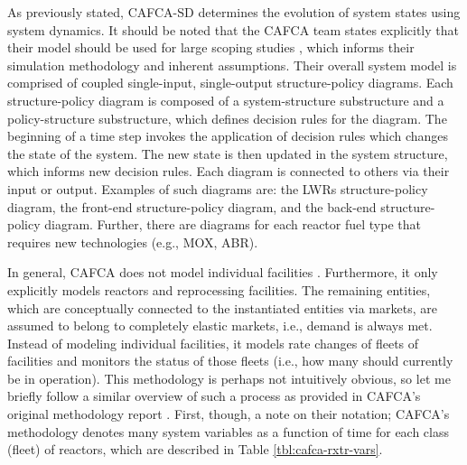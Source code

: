 As previously stated, CAFCA-SD determines the evolution of system states using
system dynamics. It should be noted that the CAFCA team states explicitly that
their model should be used for large scoping studies \cite{guerin_impact_2009},
which informs their simulation methodology and inherent assumptions. Their
overall system model is comprised of coupled single-input, single-output
structure-policy diagrams. Each structure-policy diagram is composed of a
system-structure substructure and a policy-structure substructure, which defines
decision rules for the diagram. The beginning of a time step invokes the
application of decision rules which changes the state of the system. The new
state is then updated in the system structure, which informs new decision
rules. Each diagram is connected to others via their input or output. Examples
of such diagrams are: the LWRs structure-policy diagram, the front-end
structure-policy diagram, and the back-end structure-policy diagram. Further,
there are diagrams for each reactor fuel type that requires new technologies
(e.g., MOX, ABR).

In general, CAFCA does not model individual
facilities \cite{guerin_impact_2009}. Furthermore, it only explicitly models
reactors and reprocessing facilities. The remaining entities, which are
conceptually connected to the instantiated entities via markets, are assumed to
belong to completely elastic markets, i.e., demand is always met. Instead of
modeling individual facilities, it models rate changes of fleets of facilities
and monitors the status of those fleets (i.e., how many should currently be in
operation). This methodology is perhaps not intuitively obvious, so let me
briefly follow a similar overview of such a process as provided in CAFCA's
original methodology report \cite{busquim_e_silva_system_2008}. First, though, a
note on their notation; CAFCA's methodology denotes many system variables as a
function of time for each class (fleet) of reactors, which are described in
Table \ref{tbl:cafca-rxtr-vars}.

